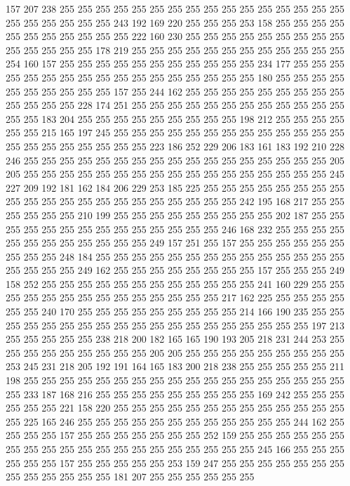 157 207 238 255 255 255 255 255 255 255 255 255 255 255 255 255 255 255 255 255
255 255 255 255 255 243 192 169 220 255 255 255 253 158 255 255 255 255 255 255
255 255 255 255 255 222 160 230 255 255 255 255 255 255 255 255 255 255 255 255
255 255 178 219 255 255 255 255 255 255 255 255 255 255 255 255 254 160 157 255
255 255 255 255 255 255 255 255 255 255 234 177 255 255 255 255 255 255 255 255
255 255 255 255 255 255 255 255 255 180 255 255 255 255 255 255 255 255 255 255
157 255 244 162 255 255 255 255 255 255 255 255 255 255 255 255 255 228 174 251
255 255 255 255 255 255 255 255 255 255 255 255 255 255 183 204 255 255 255 255
255 255 255 255 255 198 212 255 255 255 255 255 255 215 165 197 245 255 255 255
255 255 255 255 255 255 255 255 255 255 255 255 255 255 255 255 255 255 223 186
252 229 206 183 161 183 192 210 228 246 255 255 255 255 255 255 255 255 255 255
255 255 255 255 255 255 255 205 205 255 255 255 255 255 255 255 255 255 255 255
255 255 255 255 255 255 245 227 209 192 181 162 184 206 229 253 185 225 255 255
255 255 255 255 255 255 255 255 255 255 255 255 255 255 255 255 255 255 255 242
195 168 217 255 255 255 255 255 255 210 199 255 255 255 255 255 255 255 255 255
202 187 255 255 255 255 255 255 255 255 255 255 255 255 255 255 246 168 232 255
255 255 255 255 255 255 255 255 255 255 255 249 157 251 255 157 255 255 255 255
255 255 255 255 255 248 184 255 255 255 255 255 255 255 255 255 255 255 255 255
255 255 255 255 255 249 162 255 255 255 255 255 255 255 255 157 255 255 255 249
158 252 255 255 255 255 255 255 255 255 255 255 255 255 241 160 229 255 255 255
255 255 255 255 255 255 255 255 255 255 255 217 162 225 255 255 255 255 255 255
240 170 255 255 255 255 255 255 255 255 255 214 166 190 235 255 255 255 255 255
255 255 255 255 255 255 255 255 255 255 255 255 255 255 197 213 255 255 255 255
255 238 218 200 182 165 165 190 193 205 218 231 244 253 255 255 255 255 255 255
255 255 255 205 205 255 255 255 255 255 255 255 255 255 253 245 231 218 205 192
191 164 165 183 200 218 238 255 255 255 255 255 211 198 255 255 255 255 255 255
255 255 255 255 255 255 255 255 255 255 255 255 255 233 187 168 216 255 255 255
255 255 255 255 255 255 169 242 255 255 255 255 255 255 221 158 220 255 255 255
255 255 255 255 255 255 255 255 255 255 255 225 165 246 255 255 255 255 255 255
255 255 255 255 255 255 244 162 255 255 255 255 157 255 255 255 255 255 255 255
252 159 255 255 255 255 255 255 255 255 255 255 255 255 255 255 255 255 255 255
255 255 245 166 255 255 255 255 255 255 157 255 255 255 255 255 253 159 247 255
255 255 255 255 255 255 255 255 255 255 255 255 181 207 255 255 255 255 255 255
